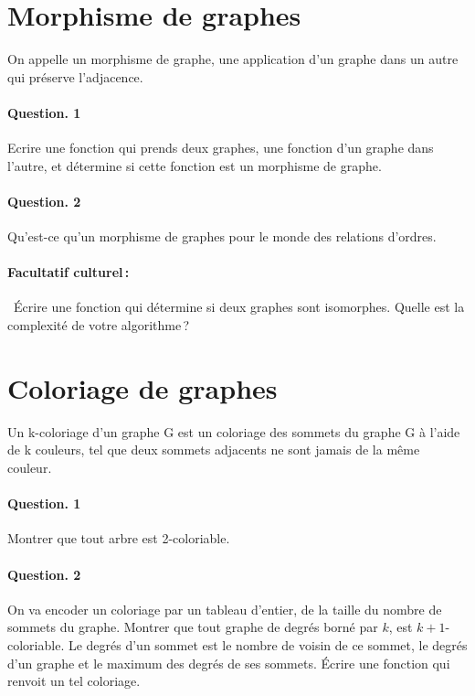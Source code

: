 \documentclass[10pt,a4paper]{article}
\begin{document}
\section{Morphisme de graphes}
On appelle un morphisme de graphe, une application d'un graphe dans un
autre qui préserve l'adjacence.

\paragraph{Question. 1\\} Ecrire une fonction qui prends deux graphes,
une fonction d'un graphe dans l'autre, et détermine si cette fonction est
un morphisme de graphe. 

\paragraph{Question. 2\\}
Qu'est-ce qu'un morphisme de graphes pour le monde des relations d'ordres. 

\paragraph{Facultatif culturel\,:\\} Écrire une fonction qui détermine si deux graphes
sont isomorphes. Quelle est la complexité de votre algorithme\,?

\section{Coloriage de graphes}

Un k-coloriage d'un graphe G est un coloriage des sommets du graphe G à
l'aide de k couleurs, tel que deux sommets adjacents ne sont jamais de la
même couleur.

\paragraph{Question. 1\\}
Montrer que tout arbre est 2-coloriable.

\paragraph{Question. 2\\}
On va encoder un coloriage par un tableau d'entier, de la taille du
nombre de sommets du graphe. Montrer que tout graphe de degrés borné par
$k$, est $k+1$-coloriable. Le degrés d'un sommet est le nombre de voisin
de ce sommet, le degrés d'un graphe et le maximum des degrés de ses
sommets. Écrire une fonction qui renvoit un tel coloriage. 
\end{document}
